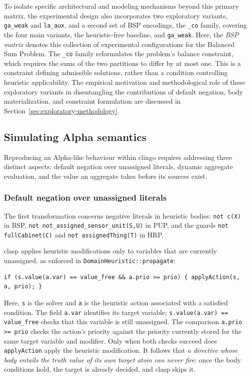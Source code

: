 To isolate specific architectural and modeling mechanisms beyond this primary matrix, the experimental design also incorporates two exploratory variants, \texttt{ga\_weak} and \texttt{la\_aux}, and a second set of BSP encodings, the \texttt{\_co} family, covering the four main variants, the heuristic-free baseline, and \texttt{ga\_weak}. Here, the \emph{BSP matrix} denotes this collection of experimental configurations for the Balanced Sum Problem. The \texttt{\_co} family reformulates the problem's balance constraint, which requires the sums of the two partitions to differ by at most one. This is a constraint defining admissible solutions, rather than a condition controlling heuristic applicability. The empirical motivation and methodological role of these exploratory variants in disentangling the contributions of default negation, body materialization, and constraint formulation are discussed in Section~\ref{sec:exploratory-methodology}.

\subsection{Simulating Alpha semantics}
\label{sec:ga-simulation}

Reproducing an Alpha-like behaviour within clingo requires addressing three distinct aspects: default negation over unassigned literals, dynamic aggregate evaluation, and the value an aggregate takes before its sources exist.

\subsubsection{Default negation over unassigned literals}

The first transformation concerns negative literals in heuristic bodies: \texttt{not c(X)} in BSP, \texttt{not not\_assigned\_sensor\_unit(S,U)} in PUP, and the guards \texttt{not fullCabinet(C)} and \texttt{not assignedThing(T)} in HRP. 

clasp applies heuristic modifications only to variables that are currently unassigned, as enforced in \texttt{DomainHeuristic::propagate}:
\begin{verbatim}
if (s.value(a.var) == value_free && a.prio >= prio) { applyAction(s, a, prio); }
\end{verbatim}
Here, \texttt{s} is the solver and \texttt{a} is the heuristic action associated with a satisfied condition. The field \texttt{a.var} identifies its target variable; \texttt{s.value(a.var) == value\_free} checks that this variable is still unassigned. The comparison \texttt{a.prio >= prio} checks the action's priority against the priority currently stored for the same target variable and modifier. Only when both checks succeed does \texttt{applyAction} apply the heuristic modification.
It follows that \emph{a directive whose body entails the truth value of its own target atom can never fire}: once the body conditions hold, the target is already decided, and clasp skips it.

